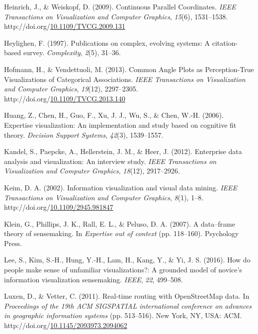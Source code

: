 \documentclass[print]{nuthesis}
\newlength{\cslhangindent}
\newenvironment{CSLReferences}[2]%
{\setlength{\parindent}{0pt}%
\everypar{\setlength{\hangindent}{\cslhangindent}}\ignorespaces}%
{\par}
\begin{document}
\begin{CSLReferences}{1}{0}
\leavevmode\hypertarget{ref-density-pcp}{}%
Heinrich, J., \& Weiskopf, D. (2009). {Continuous Parallel Coordinates}. \emph{IEEE Transactions on Visualization and Computer Graphics}, \emph{15}(6), 1531--1538. http://doi.org/\href{https://doi.org/10.1109/TVCG.2009.131}{10.1109/TVCG.2009.131}

\leavevmode\hypertarget{ref-heylighen1997}{}%
Heylighen, F. (1997). Publications on complex, evolving systems: A citation-based survey. \emph{Complexity}, \emph{2}(5), 31--36.

\leavevmode\hypertarget{ref-Hofmann:2013}{}%
Hofmann, H., \& Vendettuoli, M. (2013). {Common Angle Plots as Perception-True Visualizations of Categorical Associations}. \emph{IEEE Transactions on Visualization and Computer Graphics}, \emph{19}(12), 2297--2305. http://doi.org/\href{https://doi.org/10.1109/TVCG.2013.140}{10.1109/TVCG.2013.140}

\leavevmode\hypertarget{ref-huang2006}{}%
Huang, Z., Chen, H., Guo, F., Xu, J. J., Wu, S., \& Chen, W.-H. (2006). Expertise visualization: An implementation and study based on cognitive fit theory. \emph{Decision Support Systems}, \emph{42}(3), 1539--1557.

\leavevmode\hypertarget{ref-kandel2012}{}%
Kandel, S., Paepcke, A., Hellerstein, J. M., \& Heer, J. (2012). Enterprise data analysis and visualization: An interview study. \emph{IEEE Transactions on Visualization and Computer Graphics}, \emph{18}(12), 2917--2926.

\leavevmode\hypertarget{ref-kiem2002}{}%
Keim, D. A. (2002). Information visualization and visual data mining. \emph{IEEE Transactions on Visualization and Computer Graphics}, \emph{8}(1), 1--8. http://doi.org/\href{https://doi.org/10.1109/2945.981847}{10.1109/2945.981847}

\leavevmode\hypertarget{ref-klein2007}{}%
Klein, G., Phillips, J. K., Rall, E. L., \& Peluso, D. A. (2007). A data--frame theory of sensemaking. In \emph{Expertise out of context} (pp. 118--160). Psychology Press.

\leavevmode\hypertarget{ref-lee}{}%
Lee, S., Kim, S.-H., Hung, Y.-H., Lam, H., Kang, Y., \& Yi, J. S. (2016). How do people make sense of unfamiliar visualizations?: A grounded model of novice's information visualization sensemaking. \emph{IEEE}, \emph{22}, 499--508.

\leavevmode\hypertarget{ref-luxen-vetter-2011}{}%
Luxen, D., \& Vetter, C. (2011). Real-time routing with OpenStreetMap data. In \emph{Proceedings of the 19th ACM SIGSPATIAL international conference on advances in geographic information systems} (pp. 513--516). New York, NY, USA: ACM. http://doi.org/\href{https://doi.org/10.1145/2093973.2094062}{10.1145/2093973.2094062}


\end{CSLReferences}
\end{document}
